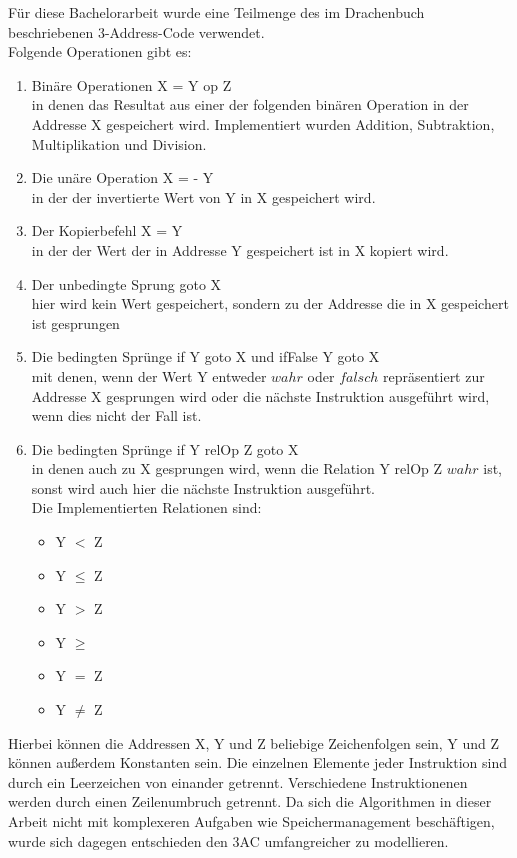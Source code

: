 Für diese Bachelorarbeit wurde eine Teilmenge des im Drachenbuch \cite[Kapitel 6.2.1]{D}
beschriebenen 3-Address-Code verwendet.\\
Folgende Operationen gibt es:
\begin{enumerate}
  \item Binäre Operationen X = Y op Z\\
    in denen das Resultat aus einer der folgenden binären Operation
    in der Addresse X gespeichert wird. Implementiert wurden Addition, 
    Subtraktion, Multiplikation und Division.
  \item Die unäre Operation X = - Y\\
    in der der invertierte Wert von Y in X gespeichert wird.
  \item Der Kopierbefehl X = Y\\
    in der der Wert der in Addresse Y gespeichert ist in X kopiert wird.
  \item Der unbedingte Sprung goto X\\
    hier wird kein Wert gespeichert, sondern zu der Addresse die in X gespeichert ist gesprungen
  \item Die bedingten Sprünge if Y goto X und ifFalse Y goto X\\
    mit denen, wenn der Wert Y entweder $wahr$ oder $falsch$ repräsentiert 
    zur Addresse X gesprungen wird  
    oder die nächste Instruktion ausgeführt wird, wenn dies nicht der Fall ist.
  \item Die bedingten Sprünge if Y relOp Z goto X\\
    in denen auch zu X gesprungen wird, wenn die Relation Y relOp Z $wahr$ ist, 
    sonst wird auch hier die nächste Instruktion ausgeführt.\\
    Die Implementierten Relationen sind: 
    \begin{itemize}
      \item Y $<$ Z
      \item Y $\leq$ Z
      \item Y $>$ Z
      \item Y $\geq$ 
      \item Y $=$ Z
      \item Y $\neq$ Z
    \end{itemize}
\end{enumerate}

Hierbei können die Addressen X, Y und Z beliebige Zeichenfolgen sein, 
Y und Z können außerdem Konstanten sein.
Die einzelnen Elemente jeder Instruktion sind durch ein Leerzeichen von einander
getrennt. Verschiedene Instruktionenen werden durch einen Zeilenumbruch getrennt.
Da sich die Algorithmen in dieser Arbeit nicht mit komplexeren Aufgaben wie
Speichermanagement beschäftigen, wurde sich dagegen entschieden den 3AC
umfangreicher zu modellieren.\\

